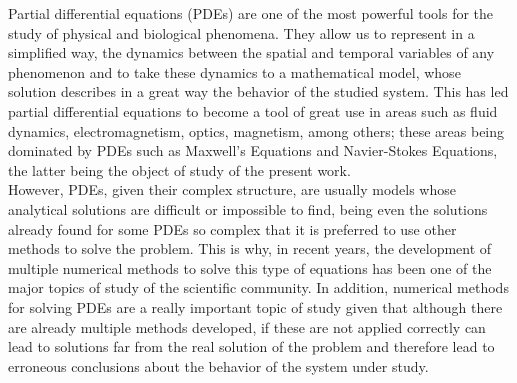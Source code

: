 \documentclass[12pt,letterpaper]{article}
\begin{document}

Partial differential equations (PDEs) are one of the most powerful tools for the study of physical and biological phenomena. They allow us to represent in a simplified way, the dynamics between the spatial and temporal variables of any phenomenon and to take these dynamics to a mathematical model, whose solution describes in a great way the behavior of the studied system\cite{logan2014applied}. This has led partial differential equations to become a tool of great use in areas such as fluid dynamics, electromagnetism, optics, magnetism, among others\cite{farlow1993partial}; these areas being dominated by PDEs such as Maxwell's Equations and Navier-Stokes Equations, the latter being the object of study of the present work. \\

However, PDEs, given their complex structure, are usually models whose analytical solutions are difficult or impossible to find, being even the solutions already found for some PDEs so complex that it is preferred to use other methods to solve the problem\cite{strauss2007partial}. This is why, in recent years, the development of multiple numerical methods to solve this type of equations has been one of the major topics of study of the scientific community. In addition, numerical methods for solving PDEs are a really important topic of study given that although there are already multiple methods developed, if these are not applied correctly can lead to solutions far from the real solution of the problem and therefore lead to erroneous conclusions about the behavior of the system under study.\\
\end{document}
